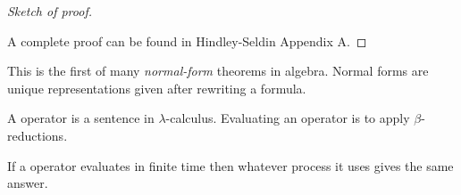\begin{proof}[Sketch of proof]
\begin{center}
\end{center}


A complete proof can be found in Hindley-Seldin Appendix A.
\end{proof}

This is the first of many \emph{normal-form} theorems in algebra.
Normal forms are unique representations given after rewriting a formula.


\begin{definition}
    A operator is a sentence in $\lambda$-calculus.
    Evaluating an operator is to apply $\beta$-reductions.
\end{definition}

\begin{corollary}
    If a operator evaluates in finite time then whatever process it uses 
    gives the same answer.
\end{corollary}

